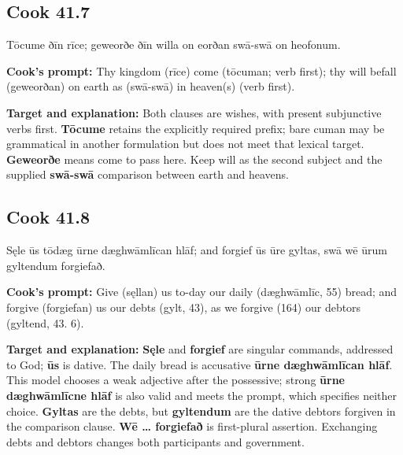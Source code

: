 \par\begin{minipage}{\linewidth}\raggedright
\subsection*{Cook 41.7}

Tōcume ðīn rīce; geweorðe ðīn willa on eorðan swā-swā on heofonum.

\textbf{Cook's prompt:} Thy kingdom (rīce) come (tōcuman; verb first); thy will befall (geweorðan) on earth as (swā-swā) in heaven(s) (verb first).

\textbf{Target and explanation:} Both clauses are wishes, with present subjunctive verbs first. \textbf{Tōcume} retains the explicitly required prefix; bare cuman may be grammatical in another formulation but does not meet that lexical target. \textbf{Geweorðe} means come to pass here. Keep will as the second subject and the supplied \textbf{swā-swā} comparison between earth and heavens.

\end{minipage}\par\addvspace{4pt}

\par\begin{minipage}{\linewidth}\raggedright
\subsection*{Cook 41.8}

Sęle ūs tōdæg ūrne dæghwāmlīcan hlāf; and forgief ūs ūre gyltas, swā wē ūrum gyltendum forgiefað.

\textbf{Cook's prompt:} Give (sęllan) us to-day our daily (dæghwāmlīc, 55) bread; and forgive (forgiefan) us our debts (gylt, 43), as we forgive (164) our debtors (gyltend, 43. 6).

\textbf{Target and explanation:} \textbf{Sęle} and \textbf{forgief} are singular commands, addressed to God; \textbf{ūs} is dative. The daily bread is accusative \textbf{ūrne dæghwāmlīcan hlāf}. This model chooses a weak adjective after the possessive; strong \textbf{ūrne dæghwāmlīcne hlāf} is also valid and meets the prompt, which specifies neither choice. \textbf{Gyltas} are the debts, but \textbf{gyltendum} are the dative debtors forgiven in the comparison clause. \textbf{Wē … forgiefað} is first-plural assertion. Exchanging debts and debtors changes both participants and government.

\end{minipage}\par\addvspace{4pt}

